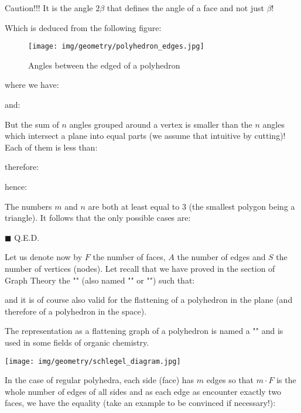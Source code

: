 {\begin{dem}
	
	\begin{tcolorbox}[colback=red!5,borderline={1mm}{2mm}{red!5},arc=0mm,boxrule=0pt]
	\bcbombe Caution!!! It is the angle $2\beta$ that defines the angle of a face and not just $\beta$!
	\end{tcolorbox}
	
	
	Which is deduced from the following figure:
	\begin{figure}[H]
		\centering
		\texttt{[image: img/geometry/polyhedron\_edges.jpg]}
		\caption{Angles between the edged of a polyhedron}
	\end{figure}
	where we have:
	
	and:
	
	But the sum of $n$ angles grouped around a vertex is smaller than the $n$ angles which intersect a plane into equal parts (we assume that intuitive by cutting)! Each of them is less than:
	
	therefore:
	
	hence:
	
	The numbers $m$ and $n$ are both at least equal to $3$ (the smallest polygon being a triangle). It follows that the only possible cases are:
		
	\begin{flushright}
		$\blacksquare$  Q.E.D.
	\end{flushright}
	\end{dem}

	Let us denote now by $F$ the number of faces, $A$ the number of edges and $S$ the number of vertices (nodes). Let recall that we have proved in the section of Graph Theory the "" (also named "" or "") such that:	
	
	and it is of course also valid for the flattening of a polyhedron in the plane (and therefore of a polyhedron in the space).
	\begin{tcolorbox}[title=Remark,colframe=black,arc=10pt]
	The representation as a flattening graph of a polyhedron is named a "" and is used in some fields of organic chemistry.
	\begin{center}
		\texttt{[image: img/geometry/schlegel\_diagram.jpg]}
	\end{center}
	\end{tcolorbox}	
	In the case of regular polyhedra, each side (face) has $m$ edges so that $m\cdot F$ is the whole number of edges of all sides and as each edge as encounter exactly two faces, we have the equality (take an example to be convinced if necessary!):
	
}
